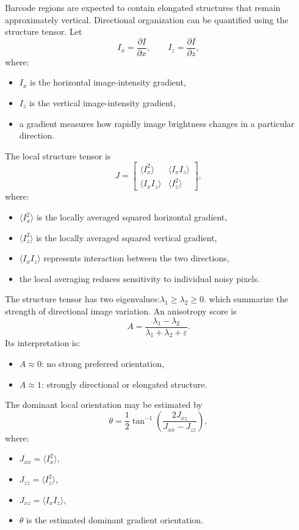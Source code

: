 \documentclass[11pt]{article}
\begin{document}
Barcode regions are expected to contain elongated structures that remain
approximately vertical. Directional organization can be quantified using the
structure tensor.
Let
\[
I_x
=
\frac{\partial I}{\partial x},
\qquad
I_z
=
\frac{\partial I}{\partial z},
\]
where:
\begin{itemize}
    \item \(I_x\) is the horizontal image-intensity gradient,
    \item \(I_z\) is the vertical image-intensity gradient,
    \item a gradient measures how rapidly image brightness changes in a
    particular direction.
\end{itemize}
The local structure tensor is
\[
J
=
\begin{bmatrix}
\langle I_x^2\rangle
&
\langle I_x I_z\rangle
\\
\langle I_x I_z\rangle
&
\langle I_z^2\rangle
\end{bmatrix},
\]
where:
\begin{itemize}
    \item \(\langle I_x^2\rangle\) is the locally averaged squared horizontal
    gradient,
    \item \(\langle I_z^2\rangle\) is the locally averaged squared vertical
    gradient,
    \item \(\langle I_xI_z\rangle\) represents interaction between the two
    directions,
    \item the local averaging reduces sensitivity to individual noisy pixels.
\end{itemize}
The structure tensor has two eigenvalues:\(\lambda_1 \geq \lambda_2 \geq 0.\) which summarize the strength of directional image variation.
An anisotropy score is
\[
A
=
\frac{
\lambda_1-\lambda_2
}{
\lambda_1+\lambda_2+\varepsilon
}.
\]
Its interpretation is:
\begin{itemize}
    \item \(A \approx 0\): no strong preferred orientation,
    \item \(A \approx 1\): strongly directional or elongated structure.
\end{itemize}
The dominant local orientation may be estimated by
\[
\theta
=
\frac{1}{2}
\tan^{-1}
\left(
\frac{
2J_{xz}
}{
J_{xx}-J_{zz}
}
\right),
\]
where:
\begin{itemize}
    \item \(J_{xx}=\langle I_x^2\rangle\),
    \item \(J_{zz}=\langle I_z^2\rangle\),
    \item \(J_{xz}=\langle I_xI_z\rangle\),
    \item \(\theta\) is the estimated dominant gradient orientation.
\end{itemize}
\end{document}
